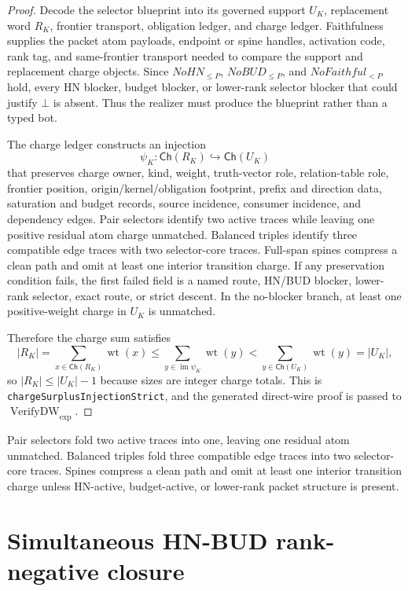 \documentclass[10.5pt,a4paper]{article}
\newcommand{\Ch}{\mathsf{Ch}}
\newcommand{\VerifyDW}{\operatorname{VerifyDW}_{\exp}}
\newcommand{\wt}{\operatorname{wt}}
\newcommand{\Bot}{\bot}
\begin{document}
\begin{proof}
Decode the selector blueprint into its governed support \(U_K\), replacement word \(R_K\), frontier transport, obligation ledger, and charge ledger.  Faithfulness supplies the packet atom payloads, endpoint or spine handles, activation code, rank tag, and same-frontier transport needed to compare the support and replacement charge objects.  Since \(NoHN_{\le P}\), \(NoBUD_{\le P}\), and \(NoFaithful_{<P}\) hold, every HN blocker, budget blocker, or lower-rank selector blocker that could justify \(\Bot\) is absent.  Thus the realizer must produce the blueprint rather than a typed bot.

The charge ledger constructs an injection
\[
\psi_K:\Ch(R_K)\hookrightarrow\Ch(U_K)
\]
that preserves charge owner, kind, weight, truth-vector role, relation-table role, frontier position, origin/kernel/obligation footprint, prefix and direction data, saturation and budget records, source incidence, consumer incidence, and dependency edges.  Pair selectors identify two active traces while leaving one positive residual atom charge unmatched.  Balanced triples identify three compatible edge traces with two selector-core traces.  Full-span spines compress a clean path and omit at least one interior transition charge.  If any preservation condition fails, the first failed field is a named route, HN/BUD blocker, lower-rank selector, exact route, or strict descent.  In the no-blocker branch, at least one positive-weight charge in \(U_K\) is unmatched.

Therefore the charge sum satisfies
\[
|R_K|=\sum_{x\in\Ch(R_K)}\wt(x)
 \le \sum_{y\in\operatorname{im}\psi_K}\wt(y)
 < \sum_{y\in\Ch(U_K)}\wt(y)=|U_K|,
\]
so \(|R_K|\le |U_K|-1\) because sizes are integer charge totals.  This is \texttt{chargeSurplusInjectionStrict}, and the generated direct-wire proof is passed to \(\VerifyDW\).
\end{proof}

Pair selectors fold two active traces into one, leaving one residual atom unmatched. Balanced triples fold three compatible edge traces into two selector-core traces. Spines compress a clean path and omit at least one interior transition charge unless HN-active, budget-active, or lower-rank packet structure is present.

\section{Simultaneous HN-BUD rank-negative closure}
\end{document}
